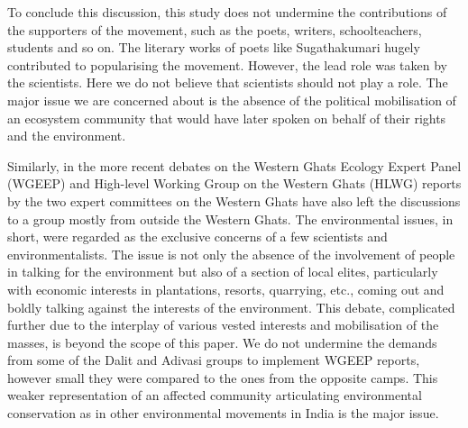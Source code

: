\documentclass[twoside, 13pt]{article}
\begin{document}
{{{{To conclude this discussion, this study does not undermine the contributions of the supporters of the movement, such as the poets, writers, schoolteachers, students and so on. The literary works of poets like Sugathakumari hugely contributed to popularising the movement. However, the lead role was taken by the scientists. Here we do not believe that scientists should not play a role. The major issue we are concerned about is the absence of the political mobilisation of an ecosystem community that would have later spoken on behalf of their rights and the environment.

Similarly, in the more recent debates on the Western Ghats Ecology Expert Panel (WGEEP) and High-level Working Group on the Western Ghats (HLWG) reports by the two expert committees on the Western Ghats have also left the discussions to a group mostly from outside the Western Ghats. The environmental issues, in short, were regarded as the exclusive concerns of a few scientists and environmentalists. The issue is not only the absence of the involvement of people in talking for the environment but also of a section of local elites, particularly with economic interests in plantations, resorts, quarrying, etc., coming out and boldly talking against the interests of the environment. This debate, complicated further due to the interplay of various vested interests and mobilisation of the masses, is beyond the scope of this paper. We do not undermine the demands from some of the Dalit and Adivasi groups to implement WGEEP reports, however small they were compared to the ones from the opposite camps. This weaker representation of an affected community articulating environmental conservation as in other environmental movements in India is the major issue.

}}}}
\end{document}

